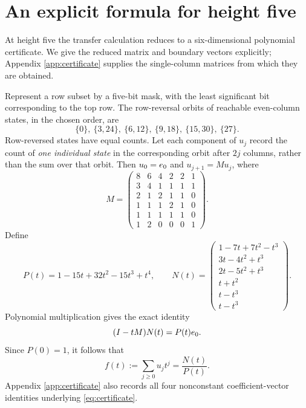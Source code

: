 \section{An explicit formula for height five}\label{sec:five}

At height five the transfer calculation reduces to a
six-dimensional polynomial certificate.
We give the reduced matrix and boundary vectors explicitly;
Appendix \ref{app:certificate} supplies the single-column
matrices from which they are obtained.

Represent a row subset by a five-bit mask, with the least
significant bit corresponding to the top row.
The row-reversal orbits of reachable even-column states,
in the chosen order, are
\begin{equation}\label{eq:even-orbits}
 \{0\},\ \{3,24\},\ \{6,12\},\ \{9,18\},\
 \{15,30\},\ \{27\}.
\end{equation}
Row-reversed states have equal counts.
Let each component of $u_j$ record the count of \emph{one
individual state} in the corresponding orbit after $2j$
columns, rather than the sum over that orbit.
Then $u_0=e_0$ and $u_{j+1}=Mu_j$, where
\begin{equation}\label{eq:M5}
 M=\begin{pmatrix}
8&6&4&2&2&1\\
3&4&1&1&1&1\\
2&1&2&1&1&0\\
1&1&1&2&1&0\\
1&1&1&1&1&0\\
1&2&0&0&0&1
\end{pmatrix}.
\end{equation}
Define
\begin{equation}\label{eq:PN}
 P(t)=1-15t+32t^2-15t^3+t^4,\qquad
 N(t)=\begin{pmatrix}
1-7t+7t^2-t^3\\
3t-4t^2+t^3\\
2t-5t^2+t^3\\
t+t^2\\
t-t^3\\
t-t^3
\end{pmatrix}.
\end{equation}
Polynomial multiplication gives the exact identity
\begin{equation}\label{eq:certificate}
 (I-tM)N(t)=P(t)e_0.
\end{equation}
Since $P(0)=1$, it follows that
\[
 f(t):=\sum_{j\ge0}u_jt^j=\frac{N(t)}{P(t)}.
\]
Appendix \ref{app:certificate} also records all four nonconstant
coefficient-vector identities underlying
\eqref{eq:certificate}.

